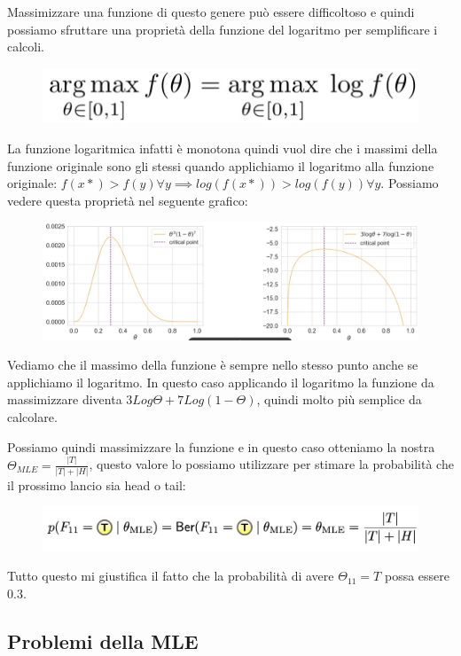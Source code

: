 \documentclass[14pt]{extreport}
\begin{document}
Massimizzare una funzione di questo genere può essere difficoltoso e quindi possiamo sfruttare una proprietà della funzione del logaritmo per
semplificare i calcoli. 
\begin{figure}[H]
\centering
  \includegraphics[width=0.5\linewidth]{23.jpeg}
\end{figure}
La funzione logaritmica infatti è monotona quindi vuol dire che i massimi della funzione originale sono gli stessi quando applichiamo il logaritmo
alla funzione originale: $f(x*) > f(y) \forall y \implies log(f(x*))> log(f(y))  \forall y $. Possiamo vedere questa proprietà nel seguente grafico:
\begin{figure}[H]
\centering
  \includegraphics[width=\linewidth]{22.jpeg}
\end{figure}

Vediamo che il massimo della funzione è sempre nello stesso punto anche se applichiamo il logaritmo. In questo caso applicando il logaritmo la
funzione da massimizzare diventa $3Log\Theta + 7Log(1-\Theta)$, quindi molto più semplice da calcolare.

Possiamo quindi massimizzare la funzione e in questo caso otteniamo la nostra $\Theta_{MLE} = \frac{|T|}{|T|+|H|}$, questo valore lo possiamo
utilizzare per stimare la probabilità che il prossimo lancio sia head o tail:
\begin{figure}[H]
\centering
\includegraphics[width=0.7\linewidth]{24.jpeg}
\end{figure}
Tutto questo mi giustifica il fatto che la probabilità di avere $\Theta_{11} = T$ possa essere 0.3.

\subsection{Problemi della MLE}
\end{document}

